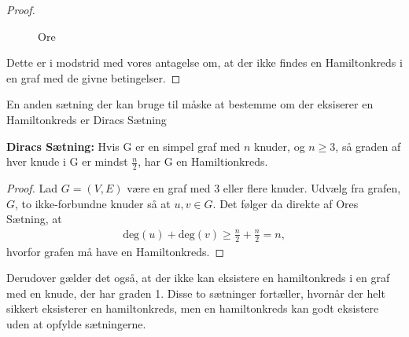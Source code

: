 \begin{proof}
\begin{figure}[h]
\centering
{}
\caption{Ore} 
\label{ore_bevis}
\end{figure}

Dette er i modstrid med vores antagelse om, at der ikke findes en Hamiltonkreds i en graf med de givne betingelser.
\end{proof}

En anden sætning der kan bruge til måske at bestemme om der eksiserer en Hamiltonkreds er Diracs Sætning 

\begin{thm} \label{diracs_thm}
\textbf{Diracs Sætning:} 
Hvis G er en simpel graf med $n$ knuder, og $n\geq3$, så graden af hver knude i G er mindst $\frac{n}{2}$, har G en Hamiltionkreds.  
\end{thm}

\begin{proof}
Lad $G=(V,E)$ være en graf med 3 eller flere knuder. Udvælg fra grafen, $G$, to ikke-forbundne knuder så at $u,v \in G$. Det følger da direkte af Ores Sætning, at
\begin{align*}
\textrm{deg}(u) + \textrm{deg}(v) \geq \frac{n}{2} + \frac{n}{2} = n,
\end{align*}
hvorfor grafen må have en Hamiltonkreds.
\end{proof}

Derudover gælder det også, at der ikke kan eksistere en hamiltonkreds i en graf med en knude, der har graden 1. 
Disse to sætninger fortæller, hvornår der helt sikkert eksisterer en hamiltonkreds, men en hamiltonkreds kan godt eksistere uden at opfylde sætningerne. 

